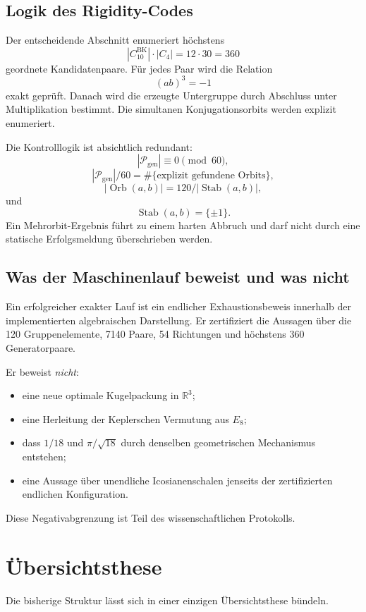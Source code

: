 \documentclass[11pt,a4paper]{article}
\theoremstyle{definition}
\newcommand{\Pgen}{\mathcal P_{\mathrm{gen}}}
\newcommand{\R}{\mathbb R}
\begin{document}
\subsection{Logik des Rigidity-Codes}

Der entscheidende Abschnitt enumeriert höchstens
\[
|C_{10}^{\mathrm{BK}}|\cdot|C_4|
=12\cdot30
=360
\]
geordnete Kandidatenpaare. Für jedes Paar wird die Relation
\[
(ab)^3=-1
\]
exakt geprüft. Danach wird die erzeugte Untergruppe durch Abschluss unter Multiplikation bestimmt. Die simultanen Konjugationsorbits werden explizit enumeriert.

Die Kontrolllogik ist absichtlich redundant:
\[
|\Pgen|\equiv0\pmod{60},
\]
\[
|\Pgen|/60=\#\{\text{explizit gefundene Orbits}\},
\]
\[
|\operatorname{Orb}(a,b)|=
120/|\operatorname{Stab}(a,b)|,
\]
und
\[
\operatorname{Stab}(a,b)=\{\pm1\}.
\]
Ein Mehrorbit-Ergebnis führt zu einem harten Abbruch und darf nicht durch eine statische Erfolgsmeldung überschrieben werden.

\subsection{Was der Maschinenlauf beweist und was nicht}

Ein erfolgreicher exakter Lauf ist ein endlicher Exhaustionsbeweis innerhalb der implementierten algebraischen Darstellung. Er zertifiziert die Aussagen über die 120 Gruppenelemente, 7140 Paare, 54 Richtungen und höchstens 360 Generatorpaare.

Er beweist \emph{nicht}:
\begin{itemize}
\item eine neue optimale Kugelpackung in \(\R^3\);
\item eine Herleitung der Keplerschen Vermutung aus \(E_8\);
\item dass \(1/18\) und \(\pi/\sqrt{18}\) durch denselben geometrischen Mechanismus entstehen;
\item eine Aussage über unendliche Icosianenschalen jenseits der zertifizierten endlichen Konfiguration.
\end{itemize}

Diese Negativabgrenzung ist Teil des wissenschaftlichen Protokolls.

\section{Übersichtsthese}

Die bisherige Struktur lässt sich in einer einzigen Übersichtsthese bündeln.
\end{document}
